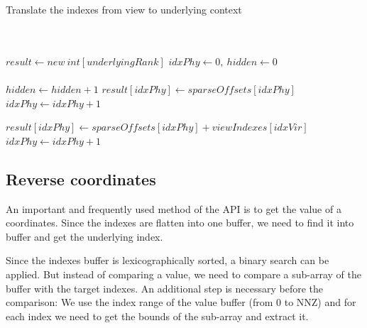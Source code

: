 	
\begin{algorithm}
	\caption{Translate the indexes from view to underlying context}
	\label{alg:translation}
	\begin{algorithmic}
		
		\\
		\\
		\State $result \gets new\ int[underlyingRank]$
		\State $idxPhy \gets 0,\ hidden \gets 0 $
		\\
		\\
		
				\State $hidden \gets hidden + 1$
			\Else
					\State $result[idxPhy] \gets sparseOffsets[idxPhy]$ 
					\State $idxPhy \gets idxPhy + 1$
				\EndWhile\\
				
					\State $result[idxPhy] \gets sparseOffsets[idxPhy] + viewIndexes[idxVir]$ 
					\State $idxPhy \gets idxPhy + 1$
				\EndIf
		
			\EndIf
			
		\EndFor		
		\EndProcedure
		\end{algorithmic}
	\end{algorithm}
	
\subsection{Reverse coordinates}

An important and frequently used method of the API is to get the value of a coordinates. Since the indexes are flatten into one buffer, we need to find it into buffer and get the underlying index.

Since the indexes buffer is lexicographically sorted, a binary search can be applied. But instead of comparing a value, we need to compare a sub-array of the buffer with the target indexes. An additional step is necessary before the comparison: We use the index range of the value buffer (from 0 to NNZ) and for each index we need to get the bounds of the sub-array and extract it.



